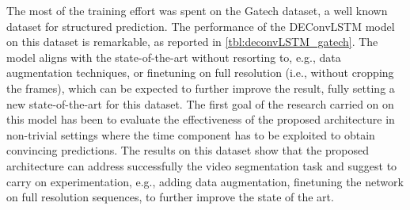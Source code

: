 \begin{table}[t]
    \caption{The results of the experiments on the effects of time correlation
        the CamVid dataset. Pixel accuracy and average Intersection over Union
        (IoU) are reported. The model seems to fail to generalize properly.}
    \label{tbl:deconvLSTM_camvid_overfit}
\end{table}




The most of the training effort was spent on the Gatech dataset, a well known
dataset for structured prediction. The performance of the DEConvLSTM model on
this dataset is remarkable, as reported in \autoref{tbl:deconvLSTM_gatech}. The
model aligns with the state-of-the-art without resorting to, e.g., data
augmentation techniques, or finetuning on full resolution (i.e., without
cropping the frames), which can be expected to further improve the result,
fully setting a new state-of-the-art for this dataset. The first goal of the
research carried on on this model has been to evaluate the effectiveness of the
proposed architecture in non-trivial settings where the time component has to
be exploited to obtain convincing predictions. The results on this dataset show
that the proposed architecture can address successfully the video segmentation
task and suggest to carry on experimentation, e.g., adding data augmentation,
finetuning the network on full resolution sequences, to further improve the
state of the art.

